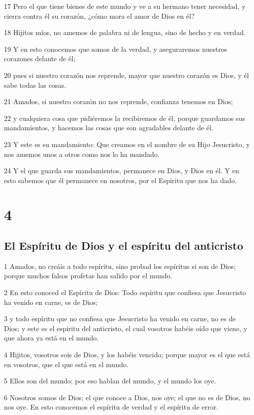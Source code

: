 \par 17 Pero el que tiene bienes de este mundo y ve a su hermano tener necesidad, y cierra contra él su corazón, ¿cómo mora el amor de Dios en él?
\par 18 Hijitos míos, no amemos de palabra ni de lengua, sino de hecho y en verdad.
\par 19 Y en esto conocemos que somos de la verdad, y aseguraremos nuestros corazones delante de él;
\par 20 pues si nuestro corazón nos reprende, mayor que nuestro corazón es Dios, y él sabe todas las cosas.
\par 21 Amados, si nuestro corazón no nos reprende, confianza tenemos en Dios;
\par 22 y cualquiera cosa que pidiéremos la recibiremos de él, porque guardamos sus mandamientos, y hacemos las cosas que son agradables delante de él.
\par 23 Y este es su mandamiento: Que creamos en el nombre de su Hijo Jesucristo, y nos amemos unos a otros como nos lo ha mandado.
\par 24 Y el que guarda sus mandamientos, permanece en Dios, y Dios en él. Y en esto sabemos que él permanece en nosotros, por el Espíritu que nos ha dado.

\chapter{4}

\section*{El Espíritu de Dios y el espíritu del anticristo}

\par 1 Amados, no creáis a todo espíritu, sino probad los espíritus si son de Dios; porque muchos falsos profetas han salido por el mundo.
\par 2 En esto conoced el Espíritu de Dios: Todo espíritu que confiesa que Jesucristo ha venido en carne, es de Dios;
\par 3 y todo espíritu que no confiesa que Jesucristo ha venido en carne, no es de Dios; y este es el espíritu del anticristo, el cual vosotros habéis oído que viene, y que ahora ya está en el mundo.
\par 4 Hijitos, vosotros sois de Dios, y los habéis vencido; porque mayor es el que está en vosotros, que el que está en el mundo.
\par 5 Ellos son del mundo; por eso hablan del mundo, y el mundo los oye.
\par 6 Nosotros somos de Dios; el que conoce a Dios, nos oye; el que no es de Dios, no nos oye. En esto conocemos el espíritu de verdad y el espíritu de error.


